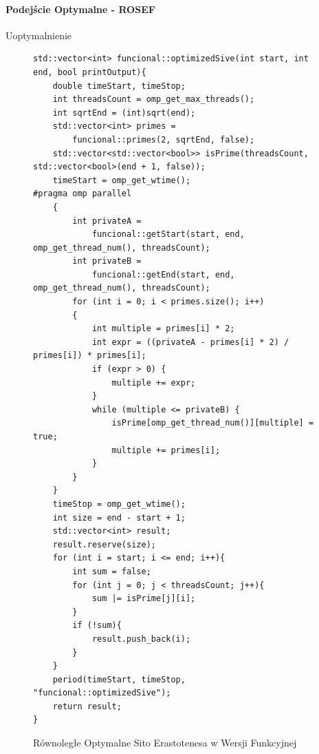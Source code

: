 \documentclass{article}
\begin{document}
                    \paragraph{Podejście Optymalne - \gls{ROSEF}}
                        Uoptymalnienie 
                        \begin{figure}[H]
                            \begin{verbatim}
std::vector<int> funcional::optimizedSive(int start, int end, bool printOutput){
    double timeStart, timeStop;
    int threadsCount = omp_get_max_threads();
    int sqrtEnd = (int)sqrt(end);
    std::vector<int> primes = 
        funcional::primes(2, sqrtEnd, false);
    std::vector<std::vector<bool>> isPrime(threadsCount, std::vector<bool>(end + 1, false));
    timeStart = omp_get_wtime();
#pragma omp parallel
    {
        int privateA = 
            funcional::getStart(start, end, omp_get_thread_num(), threadsCount);
        int privateB = 
            funcional::getEnd(start, end, omp_get_thread_num(), threadsCount);
        for (int i = 0; i < primes.size(); i++)
        {
            int multiple = primes[i] * 2;
            int expr = ((privateA - primes[i] * 2) / primes[i]) * primes[i];
            if (expr > 0) {
                multiple += expr;
            }
            while (multiple <= privateB) {
                isPrime[omp_get_thread_num()][multiple] = true;
                multiple += primes[i];
            }
        }
    }
    timeStop = omp_get_wtime();
    int size = end - start + 1;
    std::vector<int> result;
    result.reserve(size);
    for (int i = start; i <= end; i++){
        int sum = false;
        for (int j = 0; j < threadsCount; j++){
            sum |= isPrime[j][i];
        }
        if (!sum){
            result.push_back(i);
        }
    }
    period(timeStart, timeStop, "funcional::optimizedSive");
    return result;  
}
                            \end{verbatim}
                            \caption{Równoległe Optymalne Sito Erastotenesa w Wersji Funkcyjnej}
                        \end{figure}
                        
\end{document}
